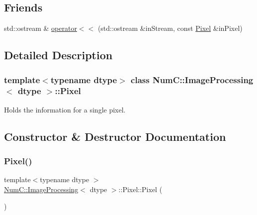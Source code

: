 \subsection*{Friends}
\begin{DoxyCompactItemize}
\item 
std\+::ostream \& \mbox{\hyperlink{class_num_c_1_1_image_processing_1_1_pixel_ab2651c4b29062ba3676ace1dde6ad93d}{operator$<$$<$}} (std\+::ostream \&in\+Stream, const \mbox{\hyperlink{class_num_c_1_1_image_processing_1_1_pixel}{Pixel}} \&in\+Pixel)
\end{DoxyCompactItemize}


\subsection{Detailed Description}
\subsubsection*{template$<$typename dtype$>$\newline
class Num\+C\+::\+Image\+Processing$<$ dtype $>$\+::\+Pixel}

Holds the information for a single pixel. 

\subsection{Constructor \& Destructor Documentation}
\mbox{\label{class_num_c_1_1_image_processing_1_1_pixel_a7a5c740eefbeab2a6e6ed4fbffbb2f04}} 
\subsubsection{\texorpdfstring{Pixel()}{Pixel()}\hspace{0.1cm}{\footnotesize\ttfamily [1/2]}}
{\footnotesize\ttfamily template$<$typename dtype $>$ \\
\mbox{\hyperlink{class_num_c_1_1_image_processing}{Num\+C\+::\+Image\+Processing}}$<$ dtype $>$\+::Pixel\+::\+Pixel (\begin{DoxyParamCaption}{ }\end{DoxyParamCaption})\hspace{0.3cm}{\ttfamily [inline]}}

